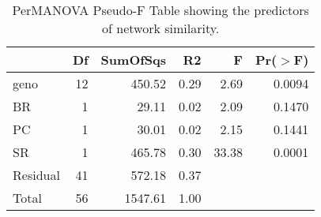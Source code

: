\begin{table}[ht]
\centering
\begin{tabular}{lrrrrr}
  \hline
 & Df & SumOfSqs & R2 & F & Pr($>$F) \\ 
  \hline
geno & 12 & 450.52 & 0.29 & 2.69 & 0.0094 \\ 
  BR & 1 & 29.11 & 0.02 & 2.09 & 0.1470 \\ 
  PC & 1 & 30.01 & 0.02 & 2.15 & 0.1441 \\ 
  SR & 1 & 465.78 & 0.30 & 33.38 & 0.0001 \\ 
  Residual & 41 & 572.18 & 0.37 &  &  \\ 
  Total & 56 & 1547.61 & 1.00 &  &  \\ 
   \hline
\end{tabular}
\caption{PerMANOVA Pseudo-F Table showing the predictors of network similarity.} 
\label{tab:cn_perm}
\end{table}
